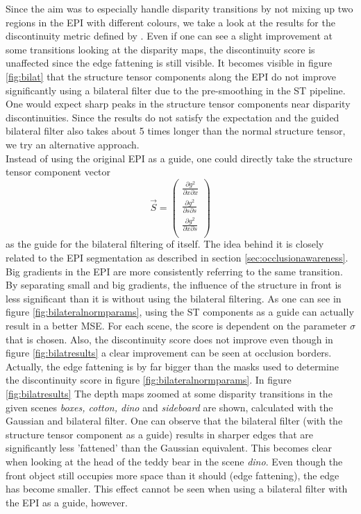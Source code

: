 \documentclass  [
  paper    = a4,
  BCOR     = 10mm,
  twoside,
  fontsize = 12pt,
  fleqn,
  toc      = bibnumbered,
  toc      = listofnumbered,
  numbers  = noendperiod,
  headings = normal,
  listof   = leveldown,
  version  = 3.03
]                                       {scrreprt}
\begin{document}
  Since the aim was to especially handle disparity transitions by not mixing up two regions in the EPI with different colours, we take a look at the results for the discontinuity metric defined by \cite{honauer2016benchmark}. Even if one can see a slight improvement at some transitions looking at the disparity maps, the discontinuity score is unaffected since the edge fattening is still visible. It becomes visible in figure \ref{fig:bilat} that the structure tensor components along the EPI do not improve significantly using a bilateral filter due to the pre-smoothing in the ST pipeline. One would expect sharp peaks in the structure tensor components near disparity discontinuities. Since the results do not satisfy the expectation and the guided bilateral filter also takes about 5 times longer than the normal structure tensor, we try an alternative approach.\\
 Instead of using the original EPI as a guide, one could directly take the structure tensor component vector 
 \begin{equation}\label{key}
 \vec S = \left(\begin{matrix}
 \frac{\partial g^2}{\partial x \partial x} \\
 \frac{\partial g^2}{\partial s \partial s} \\
 \frac{\partial g^2}{\partial x \partial s} \\
 \end{matrix}\right)
 \end{equation}
 as the guide for the bilateral filtering of itself. The idea behind it is closely related to the EPI segmentation as described in section \ref{sec:occlusionawareness}. Big gradients in the EPI are more consistently referring to the same transition. By separating small and big gradients, the influence of the structure in front is less significant than it is without using the bilateral filtering. As one can see in figure \ref{fig:bilateralnormparams}, using the ST components as a guide can actually result in a better MSE. For each scene, the score is dependent on the parameter $\sigma$ that is chosen. Also, the discontinuity score does not improve even though in figure \ref{fig:bilatresults} a clear improvement can be seen at occlusion borders. Actually, the edge fattening is by far bigger than the masks used to determine the discontinuity score in figure \ref{fig:bilateralnormparams}. In figure \ref{fig:bilatresults} The depth maps zoomed at some disparity transitions in the given scenes \textit{boxes, cotton, dino} and \textit{sideboard} are shown, calculated with the Gaussian and bilateral filter. One can observe that the bilateral filter (with the structure tensor component as a guide) results in sharper edges that are significantly less 'fattened' than the Gaussian equivalent. This becomes clear when looking at the head of the teddy bear in the scene \textit{dino}. Even though the front object still occupies more space than it should (edge fattening), the edge has become smaller. This effect cannot be seen when using a bilateral filter with the EPI as a guide, however.\\
\end{document}
